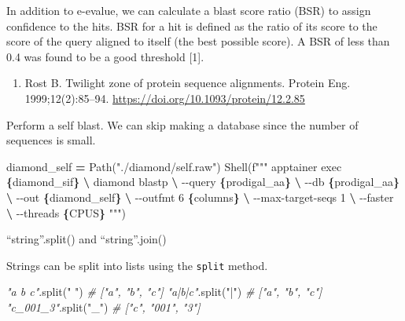 \documentclass[
]{book}
\newenvironment{Shaded}{\begin{snugshade}}{\end{snugshade}}
\newcommand{\CommentTok}[1]{\textcolor[rgb]{0.56,0.35,0.01}{\textit{#1}}}
\newcommand{\NormalTok}[1]{#1}
\newcommand{\OperatorTok}[1]{\textcolor[rgb]{0.81,0.36,0.00}{\textbf{#1}}}
\newcommand{\SpecialCharTok}[1]{\textcolor[rgb]{0.81,0.36,0.00}{\textbf{#1}}}
\newcommand{\SpecialStringTok}[1]{\textcolor[rgb]{0.31,0.60,0.02}{#1}}
\newcommand{\StringTok}[1]{\textcolor[rgb]{0.31,0.60,0.02}{#1}}
\providecommand{\tightlist}{%
  \setlength{\itemsep}{0pt}\setlength{\parskip}{0pt}}
\begin{document}
In addition to e-evalue, we can calculate a blast score ratio (BSR) to assign confidence to the hits.
BSR for a hit is defined as the ratio of its score to the score of the query aligned to itself (the best possible score).
A BSR of less than 0.4 was found to be a good threshold {[}1{]}.

\begin{enumerate}
\def\labelenumi{\arabic{enumi}.}
\tightlist
\item
  Rost B. Twilight zone of protein sequence alignments. Protein Eng. 1999;12(2):85--94. \url{https://doi.org/10.1093/protein/12.2.85}
\end{enumerate}

Perform a self blast. We can skip making a database since the number of sequences is small.

\begin{Shaded}
\begin{Highlighting}[numbers=left,,]
\NormalTok{diamond\_self }\OperatorTok{=}\NormalTok{ Path(}\StringTok{"./diamond/self.raw"}\NormalTok{)}
\NormalTok{Shell(}\SpecialStringTok{f"""}
\SpecialStringTok{apptainer exec }\SpecialCharTok{\{}\NormalTok{diamond\_sif}\SpecialCharTok{\}}\SpecialStringTok{ }\OperatorTok{\textbackslash{}}
\SpecialStringTok{    diamond blastp }\OperatorTok{\textbackslash{}}
\SpecialStringTok{        {-}{-}query }\SpecialCharTok{\{}\NormalTok{prodigal\_aa}\SpecialCharTok{\}}\SpecialStringTok{ }\OperatorTok{\textbackslash{}}
\SpecialStringTok{        {-}{-}db }\SpecialCharTok{\{}\NormalTok{prodigal\_aa}\SpecialCharTok{\}}\SpecialStringTok{ }\OperatorTok{\textbackslash{}}
\SpecialStringTok{        {-}{-}out }\SpecialCharTok{\{}\NormalTok{diamond\_self}\SpecialCharTok{\}}\SpecialStringTok{ }\OperatorTok{\textbackslash{}}
\SpecialStringTok{        {-}{-}outfmt 6 }\SpecialCharTok{\{}\NormalTok{columns}\SpecialCharTok{\}}\SpecialStringTok{ }\OperatorTok{\textbackslash{}}
\SpecialStringTok{        {-}{-}max{-}target{-}seqs 1 }\OperatorTok{\textbackslash{}}
\SpecialStringTok{        {-}{-}faster }\OperatorTok{\textbackslash{}}
\SpecialStringTok{        {-}{-}threads }\SpecialCharTok{\{}\NormalTok{CPUS}\SpecialCharTok{\}}
\SpecialStringTok{"""}\NormalTok{)}
\end{Highlighting}
\end{Shaded}

``string''.split() and ``string''.join()

Strings can be split into lists using the \texttt{split} method.

\begin{Shaded}
\begin{Highlighting}[numbers=left,,]
\CommentTok{"a b c"}\NormalTok{.split(}\StringTok{" "}\NormalTok{) }\CommentTok{\# ["a", "b", "c"]}
\CommentTok{"a|b|c"}\NormalTok{.split(}\StringTok{"|"}\NormalTok{) }\CommentTok{\# ["a", "b", "c"]}
\CommentTok{"c\_001\_3"}\NormalTok{.split(}\StringTok{"\_"}\NormalTok{) }\CommentTok{\# ["c", "001", "3"]}
\end{Highlighting}
\end{Shaded}
\end{document}
